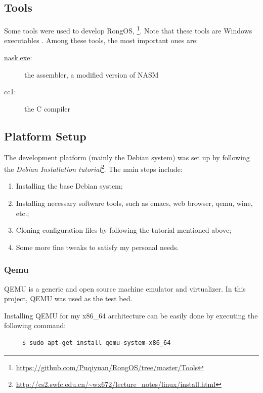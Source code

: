 \documentclass{swfcthesis}
\begin{document}
\subsection{Tools}

Some tools were used to develop RongOS, \footnote{\url{https://github.com/Puqiyuan/RongOS/tree/master/Tools}}. Note that
these tools are Windows executables . Among these tools, the most
important ones are:

\begin{description}
\item[nask.exe:] the assembler, a modified version of NASM\cite{30_os}
\item[cc1:] the C compiler
\end{description}

\subsection{Platform Setup}

The development platform (mainly the Debian system) was set up by following the
\emph{Debian Installation
  tutorial}\footnote{\url{http://cs2.swfc.edu.cn/~wx672/lecture_notes/linux/install.html}}. The
main steps include:
\begin{enumerate}
\item Installing the base Debian system;
\item Installing necessary software tools, such as emacs, web browser, qemu, wine, etc.;
\item Cloning configuration files by following the tutorial mentioned above;
\item Some more fine tweaks to satisfy my personal needs.
\end{enumerate}

\subsubsection{Qemu}

QEMU is a generic and open source machine emulator and virtualizer\cite{wiki:qemu}. In
this project, QEMU was used as the test bed.

Installing QEMU for my x86\_64 architecture can be easily done by executing the following
command:
\begin{verbatim}
     $ sudo apt-get install qemu-system-x86_64
\end{verbatim}
\end{document}
